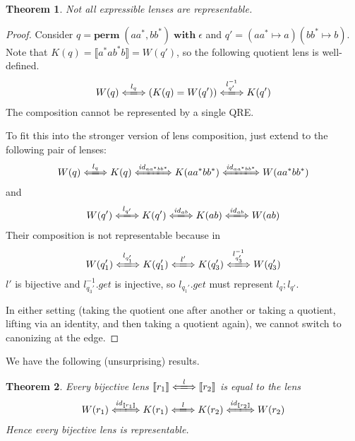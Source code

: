 \documentclass[a4paper,11pt] {article}
\theoremstyle{plain}
\newtheorem{theorem}{Theorem}[section]
\newcommand{\lget}[1]{\textit{$#1$.get}}
\newcommand{\lensbetween}[1]{\xLongleftrightarrow{#1}}
\newcommand{\perm}{ \textbf{perm}\; }
\newcommand{\with}{ \;\textbf{with}\; }
\begin{document}
\begin{theorem}
  Not all expressible lenses are representable.
\end{theorem}
\begin{proof}
  Consider
  $q = \perm(aa^*, bb^*) \with \epsilon$ and
  $q' = (aa^* \mapsto a)(bb^* \mapsto b)$.
  Note that
  $K(q) = \llbracket a^*ab^*b \rrbracket = W(q')$,
  so the following quotient lens is well-defined.
  \begin{align*}
    W(q) \lensbetween{l_q} (K(q) = W(q')) \lensbetween{l_{q'}^{-1}} K(q')
  \end{align*}
  The composition cannot be represented by a single QRE.
  
  To fit this into the stronger version of lens composition,
  just extend to the following pair of lenses:
  \begin{align*}
    W(q) \lensbetween{l_q} K(q)
    \lensbetween{\mathit{id}_{aa^*bb^*}} K(aa^*bb^*)
    \lensbetween{\mathit{id}_{aa^*bb^*}} W(aa^*bb^*)
  \end{align*}
  and
  \begin{align*}
    W(q') \lensbetween{l_{q'}} K(q')
    \lensbetween{\mathit{id}_{ab}} K(ab)
    \lensbetween{\mathit{id}_{ab}} W(ab)
  \end{align*}
  Their composition is not representable because in
  \begin{align*}
    W(q_1') \lensbetween{l_{q_1'}} K(q_1')
    \lensbetween{l'} K(q_3') \lensbetween{l_{q_3'}^{-1}} W(q_3')
  \end{align*}
  $l'$ is bijective and $\lget{l_{q_3'}^{-1}}$ is injective,
  so $\lget{l_{q_1'}}$ must represent $l_q; l_{q'}$.
  
  In either setting (taking the quotient one after another or
  taking a quotient, lifting via an identity, and then taking
  a quotient again), we cannot switch to canonizing at the edge.
\end{proof}

We have the following (unsurprising) results.

\begin{theorem}
  \label{thm:bijective-rep}
  Every bijective lens
  $\llbracket r_1 \rrbracket \lensbetween{l} \llbracket r_2 \rrbracket$ is equal to
  the lens
  \begin{align*}
    W(r_1) \lensbetween{\mathit{id}_{\llbracket r_1 \rrbracket}} K(r_1)
    \lensbetween{l}
    K(r_2) \lensbetween{\mathit{id}_{\llbracket r_2 \rrbracket}} W(r_2)
  \end{align*}
  Hence every bijective lens is representable.
\end{theorem}
\end{document}
